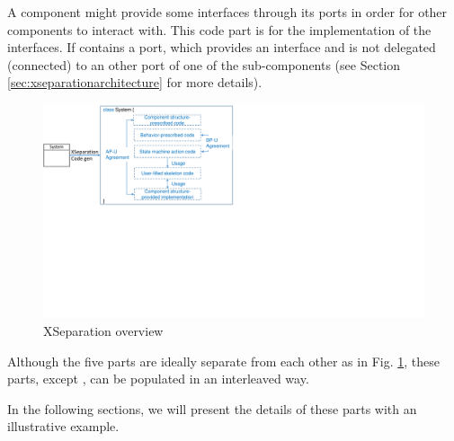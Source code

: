 \noindent	
{} A component might provide some interfaces through its ports in order for other components to interact with. 
This code part is for the implementation of the interfaces.
If  contains a port, which provides an interface and is not delegated (connected) to an other port of one of the sub-components (see Section \ref{sec:xseparationarchitecture} for more details).  
	
 

\begin{figure}
	\centering
	\includegraphics[clip, trim=0cm 10cm 16.8cm 0cm, width=\columnwidth]{figures/xseparationoverview.pdf}
	\caption{XSeparation overview} 
	\label{fig:xseparationoverview}
\end{figure}

Although the five parts are ideally separate from each other as in Fig. \ref{fig:xseparationoverview}, these parts, except , can be populated in an interleaved way.

In the following sections, we will present the details of these parts with an illustrative example.

%